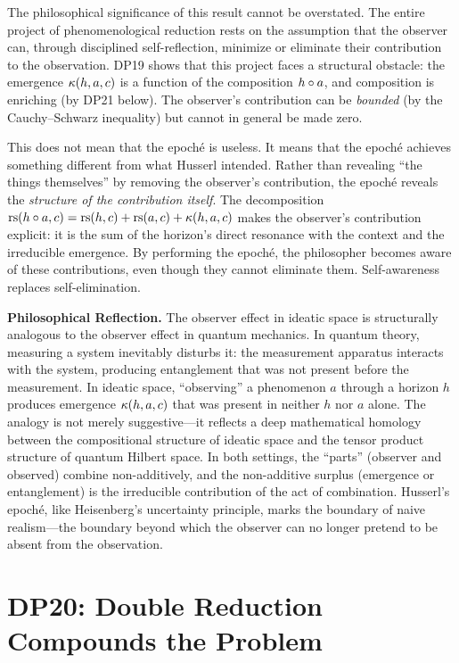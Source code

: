 The philosophical significance of this result cannot be overstated. The
entire project of phenomenological reduction rests on the assumption
that the observer can, through disciplined self-reflection, minimize
or eliminate their contribution to the observation. DP19 shows that
this project faces a structural obstacle: the emergence
$\kappa(h, a, c)$ is a function of the composition $h \circ a$,
and composition is enriching (by DP21 below). The observer's contribution
can be \emph{bounded} (by the Cauchy--Schwarz inequality) but cannot in
general be made zero.

This does not mean that the epoch\'e is useless. It means that the
epoch\'e achieves something different from what Husserl intended. Rather
than revealing ``the things themselves'' by removing the observer's
contribution, the epoch\'e reveals the \emph{structure of the
contribution itself}. The decomposition $\mathrm{rs}(h \circ a, c) =
\mathrm{rs}(h, c) + \mathrm{rs}(a, c) + \kappa(h, a, c)$ makes the observer's
contribution explicit: it is the sum of the horizon's direct resonance
with the context and the irreducible emergence. By performing the
epoch\'e, the philosopher becomes aware of these contributions, even
though they cannot eliminate them. Self-awareness replaces
self-elimination.

\begin{reflectionbox}
\textbf{Philosophical Reflection.}
The observer effect in ideatic space is structurally analogous to the
observer effect in quantum mechanics. In quantum theory, measuring a
system inevitably disturbs it: the measurement apparatus interacts with
the system, producing entanglement that was not present before the
measurement. In ideatic space, ``observing'' a phenomenon $a$ through a
horizon $h$ produces emergence $\kappa(h, a, c)$ that was present in
neither $h$ nor $a$ alone. The analogy is not merely suggestive---it
reflects a deep mathematical homology between the compositional
structure of ideatic space and the tensor product structure of quantum
Hilbert space. In both settings, the ``parts'' (observer and observed)
combine non-additively, and the non-additive surplus (emergence or
entanglement) is the irreducible contribution of the act of combination.
Husserl's epoch\'e, like Heisenberg's uncertainty principle, marks the
boundary of naive realism---the boundary beyond which the observer can
no longer pretend to be absent from the observation.
\end{reflectionbox}

\section{DP20: Double Reduction Compounds the Problem}

